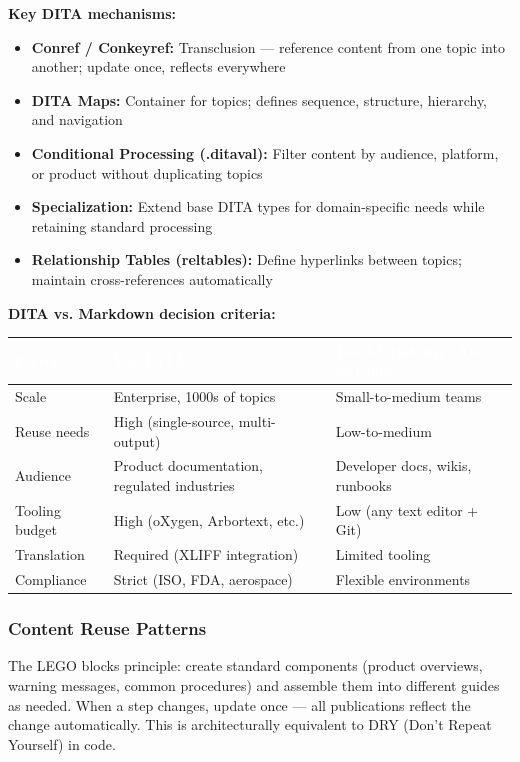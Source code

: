 \documentclass[11pt,letterpaper]{article}
\newcommand{\tableheader}[1]{\textbf{\sffamily\textcolor{white}{#1}}}
\begin{document}
\textbf{Key DITA mechanisms:}
\begin{itemize}[leftmargin=*]
  \item \textbf{Conref / Conkeyref:} Transclusion --- reference content from one topic into another; update once, reflects everywhere
  \item \textbf{DITA Maps:} Container for topics; defines sequence, structure, hierarchy, and navigation
  \item \textbf{Conditional Processing (.ditaval):} Filter content by audience, platform, or product without duplicating topics
  \item \textbf{Specialization:} Extend base DITA types for domain-specific needs while retaining standard processing
  \item \textbf{Relationship Tables (reltables):} Define hyperlinks between topics; maintain cross-references automatically
\end{itemize}

\textbf{DITA vs. Markdown decision criteria:}

\begin{center}
\begin{tabularx}{\textwidth}{L{3cm}L{4cm}L{4cm}}
\toprule
{}
\tableheader{Factor} & \tableheader{Use DITA} & \tableheader{Use Markdown / Docs-as-Code} \\
\midrule
Scale & Enterprise, 1000s of topics & Small-to-medium teams \\
Reuse needs & High (single-source, multi-output) & Low-to-medium \\
Audience & Product documentation, regulated industries & Developer docs, wikis, runbooks \\
Tooling budget & High (oXygen, Arbortext, etc.) & Low (any text editor + Git) \\
Translation & Required (XLIFF integration) & Limited tooling \\
Compliance & Strict (ISO, FDA, aerospace) & Flexible environments \\
\bottomrule
\end{tabularx}
\end{center}

\subsubsection{Content Reuse Patterns}

The LEGO blocks principle: create standard components (product overviews, warning messages, common procedures) and assemble them into different guides as needed. When a step changes, update once --- all publications reflect the change automatically. This is architecturally equivalent to DRY (Don't Repeat Yourself) in code.
\end{document}
